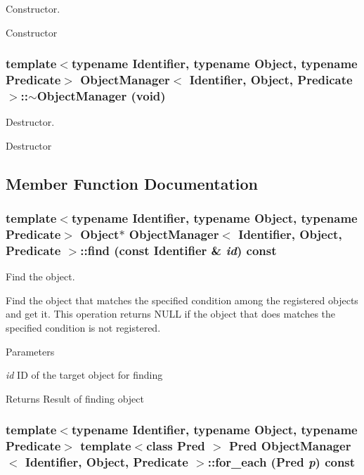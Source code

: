 Constructor. 

Constructor 
\subsubsection[{$\sim$ObjectManager}]{\setlength{\rightskip}{0pt plus 5cm}template$<$typename Identifier, typename Object, typename Predicate$>$ {\bf ObjectManager}$<$ Identifier, Object, Predicate $>$::$\sim${\bf ObjectManager} (void)\hspace{0.3cm}{\ttfamily  [inline]}}\label{classObjectManager_a38ef0a5005c4a54bda07e0fa1755566a}


Destructor. 

Destructor 

\subsection{Member Function Documentation}
\subsubsection[{find}]{\setlength{\rightskip}{0pt plus 5cm}template$<$typename Identifier, typename Object, typename Predicate$>$ Object$\ast$ {\bf ObjectManager}$<$ Identifier, Object, Predicate $>$::find (const Identifier \& {\em id}) const\hspace{0.3cm}{\ttfamily  [inline]}}\label{classObjectManager_a3f4cd060f97d7c74bc91d23e42df50de}


Find the object. 

Find the object that matches the specified condition among the registered objects and get it. This operation returns NULL if the object that does matches the specified condition is not registered.


\begin{DoxyParams}{Parameters}
\item[{\em id}]ID of the target object for finding\end{DoxyParams}
\begin{DoxyReturn}{Returns}
Result of finding object 
\end{DoxyReturn}
\subsubsection[{for\_\-each}]{\setlength{\rightskip}{0pt plus 5cm}template$<$typename Identifier, typename Object, typename Predicate$>$ template$<$class Pred $>$ Pred {\bf ObjectManager}$<$ Identifier, Object, Predicate $>$::for\_\-each (Pred {\em p}) const\hspace{0.3cm}{\ttfamily  [inline]}}\label{classObjectManager_a84fa687e172f25f6facb497396683bb4}


